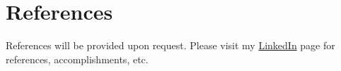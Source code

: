 \documentclass[]{cv-style}                     %
\begin{document}








\section{References}

References will be provided upon request.
Please visit my \href{http://linkedin.com/in/moorara}{LinkedIn} page for references, accomplishments, etc.







\end{document}
